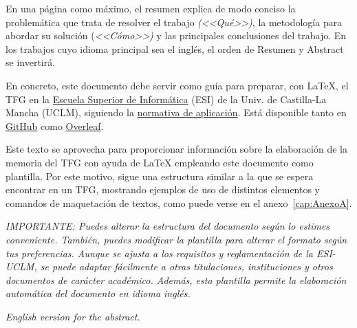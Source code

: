 \pagestyle{plain}	%


\begin{resumenPral}[spanish]{\titulo} %
En una página como máximo, el resumen explica de modo conciso la problemática que trata de resolver el trabajo \emph{(<<Qué>>)}, la metodología para  abordar su solución (\emph{<<Cómo>>)} y las principales conclusiones del trabajo. En los trabajos cuyo idioma principal sea el inglés, el orden de \textsf{Resumen} y \textsf{Abstract} se invertirá. 

En concreto, este documento debe servir como guía para preparar, con \LaTeX, el TFG en la \href{http://webpub.esi.uclm.es/}{Escuela Superior de Informática} (ESI) de la Univ. de Castilla-La Mancha (UCLM), siguiendo la \href{https://esi.uclm.es/index.php/grado-en-ingenieria-informatica/trabajos-fin-de-grado/}{normativa de aplicación}. Está disponible tanto en \href{https://github.com/JesusSalido/TFG_ESI_UCLM}{GitHub} como \href{https://www.overleaf.com/latex/templates/plantilla-de-tfg-escuela-superior-de-informatica-uclm/phjgscmfqtsw}{Overleaf}.

Este texto se aprovecha para proporcionar información sobre la elaboración de la memoria del TFG con ayuda de \LaTeX{} empleando este documento como plantilla. Por este motivo, sigue una estructura similar a la que se espera encontrar en un TFG, mostrando ejemplos de uso de distintos elementos y comandos de maquetación de textos, como puede verse en el anexo~\ref{cap:AnexoA}.

\noindent\emph{IMPORTANTE: Puedes alterar la estructura del documento según lo estimes conveniente. También, puedes modificar la plantilla para alterar el formato según tus preferencias. Aunque se ajusta a los requisitos y reglamentación de la ESI-UCLM, se puede adaptar fácilmente a otras titulaciones, instituciones y otros documentos de carácter académico. Además, esta plantilla permite la elaboración automática del documento en idioma inglés.}
\end{resumenPral}


\begin{resumenAlt}[english]{\tituloCortoAlt} 
\emph{English version for the abstract.}
\end{resumenAlt}

